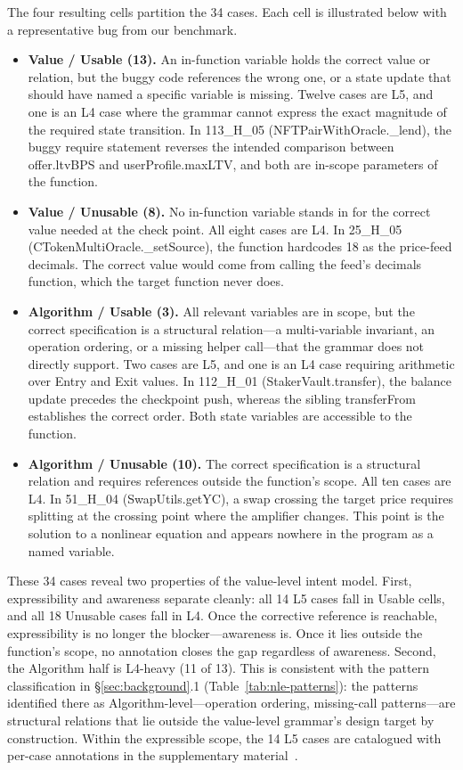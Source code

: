 \documentclass[pdflatex,sn-basic]{sn-jnl}%
\theoremstyle{thmstyleone}%
\theoremstyle{thmstyletwo}%
\theoremstyle{thmstylethree}%
\begin{document}
\begin{itemize}
  \noindent The four resulting cells partition the 34 cases. Each cell is illustrated below with a representative bug from our benchmark.
  \begin{itemize}
    \item \textbf{Value / Usable (13).} An in-function variable holds the correct value or relation, but the buggy code references the wrong one, or a state update that should have named a specific variable is missing. Twelve cases are L5, and one is an L4 case where the grammar cannot express the exact magnitude of the required state transition. In 113\_H\_05 (NFTPairWithOracle.\_lend), the buggy require statement reverses the intended comparison between offer.ltvBPS and userProfile.maxLTV, and both are in-scope parameters of the function.
    \item \textbf{Value / Unusable (8).} No in-function variable stands in for the correct value needed at the check point. All eight cases are L4. In 25\_H\_05 (CTokenMultiOracle.\_setSource), the function hardcodes 18 as the price-feed decimals. The correct value would come from calling the feed's decimals function, which the target function never does.
    \item \textbf{Algorithm / Usable (3).} All relevant variables are in scope, but the correct specification is a structural relation---a multi-variable invariant, an operation ordering, or a missing helper call---that the grammar does not directly support. Two cases are L5, and one is an L4 case requiring arithmetic over Entry and Exit values. In 112\_H\_01 (StakerVault.transfer), the balance update precedes the checkpoint push, whereas the sibling transferFrom establishes the correct order. Both state variables are accessible to the function.
    \item \textbf{Algorithm / Unusable (10).} The correct specification is a structural relation and requires references outside the function's scope. All ten cases are L4. In 51\_H\_04 (SwapUtils.getYC), a swap crossing the target price requires splitting at the crossing point where the amplifier changes. This point is the solution to a nonlinear equation and appears nowhere in the program as a named variable.
  \end{itemize}
  \noindent These 34 cases reveal two properties of the value-level intent model. First, expressibility and awareness separate cleanly: all 14 L5 cases fall in Usable cells, and all 18 Unusable cases fall in L4. Once the corrective reference is reachable, expressibility is no longer the blocker---awareness is. Once it lies outside the function's scope, no annotation closes the gap regardless of awareness. Second, the Algorithm half is L4-heavy (11 of 13). This is consistent with the pattern classification in §\ref{sec:background}.1 (Table~\ref{tab:nle-patterns}): the patterns identified there as Algorithm-level---operation ordering, missing-call patterns---are structural relations that lie outside the value-level grammar's design target by construction. Within the expressible scope, the 14 L5 cases are catalogued with per-case annotations in the supplementary material~\citep{rq2supp}.
\end{itemize}
\end{document}
